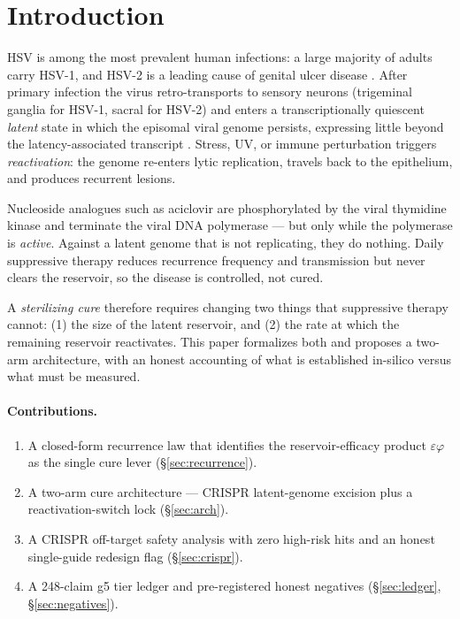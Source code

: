 \documentclass[11pt,a4paper]{article}
\begin{document}
\section{Introduction}
\label{sec:intro}
HSV is among the most prevalent human infections: a large majority of adults
carry HSV-1, and HSV-2 is a leading cause of genital ulcer disease
\citep{whoherpes}. After primary infection the virus retro-transports to
sensory neurons (trigeminal ganglia for HSV-1, sacral for HSV-2) and enters a
transcriptionally quiescent \emph{latent} state in which the episomal viral
genome persists, expressing little beyond the latency-associated transcript
\citep{roizman2013,bloom2016}. Stress, UV, or immune perturbation triggers
\emph{reactivation}: the genome re-enters lytic replication, travels back to the
epithelium, and produces recurrent lesions.

Nucleoside analogues such as aciclovir \citep{elion1977} are phosphorylated by
the viral thymidine kinase and terminate the viral DNA polymerase --- but only
while the polymerase is \emph{active}. Against a latent genome that is not
replicating, they do nothing. Daily suppressive therapy reduces recurrence
frequency and transmission but never clears the reservoir, so the disease is
controlled, not cured.

A \emph{sterilizing cure} therefore requires changing two things that
suppressive therapy cannot: (1) the size of the latent reservoir, and (2) the
rate at which the remaining reservoir reactivates. This paper formalizes both
and proposes a two-arm architecture, with an honest accounting of what is
established in-silico versus what must be measured.

\paragraph{Contributions.}
\begin{enumerate}
\item A closed-form recurrence law that identifies the reservoir-efficacy
product $\varepsilon\varphi$ as the single cure lever (\S\ref{sec:recurrence}).
\item A two-arm cure architecture --- CRISPR latent-genome excision plus a
reactivation-switch lock (\S\ref{sec:arch}).
\item A CRISPR off-target safety analysis with zero high-risk hits and an
honest single-guide redesign flag (\S\ref{sec:crispr}).
\item A 248-claim g5 tier ledger and pre-registered honest negatives
(\S\ref{sec:ledger},\,\S\ref{sec:negatives}).
\end{enumerate}
\end{document}
